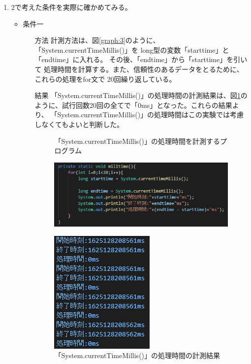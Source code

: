 \begin{enumerate}
  \item 2で考えた条件を実際に確かめてみる。
  \begin{itemize}
    \item 条件一
    \begin{itemize}
      \item[方法] 計測方法は、図\ref{graph:3}のように、「System.currentTimeMillis()」を
      long型の変数「starttime」と「endtime」に入れる。
      その後、「endtime」から「starttime」を引いて
      処理時間を計算する。また、信頼性のあるデータをとるために、これらの処理をfor文で
      20回繰り返している。
      
      \item[結果] 「System.currentTimeMillis()」の処理時間の計測結果は、図\ref{graph:4}の
      ように、試行回数20回の全てで「0ms」となった。これらの結果より、
      「System.currentTimeMillis()」の処理時間はこの実験では考慮しなくてもよいと判断した。
      \begin{figure}[htbp]
        \begin{minipage}[t]{0.5\hsize}
          \centering
          \caption{「System.currentTimeMillis()」の処理時間を計測するプログラム}
          \label{graph:3}
          \includegraphics[scale=0.75]{milltimeのプログラム.PNG}
        \end{minipage}
        \begin{minipage}[t]{0.45\hsize}
          \centering
          \caption{「System.currentTimeMillis()」の処理時間の計測結果}
          \label{graph:4}
          \includegraphics[scale=0.9]{milltimeの結果.PNG}

\end{minipage}
\end{figure}
\end{itemize}
\end{itemize}
\end{enumerate}
